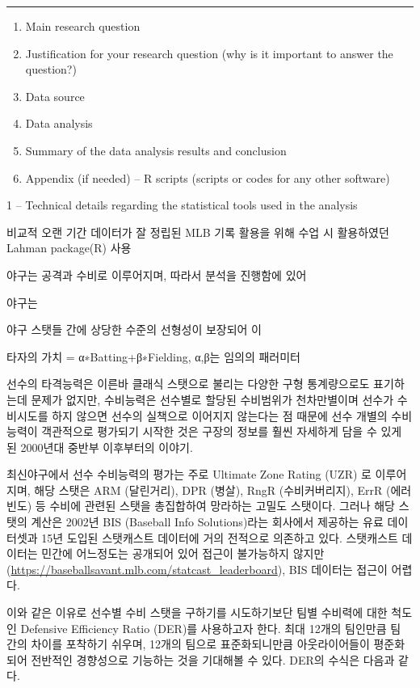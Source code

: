 \documentclass[
]{book}
\begin{document}
\begin{center}\rule{0.5\linewidth}{0.5pt}\end{center}

\begin{enumerate}
\def\labelenumi{\arabic{enumi}.}
\item
  Main research question
\item
  Justification for your research question (why is it important to answer the question?)
\item
  Data source
\item
  Data analysis
\item
  Summary of the data analysis results and conclusion
\item
  Appendix (if needed)
  -- R scripts (scripts or codes for any other software)
\end{enumerate}

1
-- Technical details regarding the statistical tools used in the analysis

비교적 오랜 기간 데이터가 잘 정립된 MLB 기록 활용을 위해
수업 시 활용하였던 Lahman package(R) 사용

야구는 공격과 수비로 이루어지며, 따라서 분석을 진행함에 있어

야구는

야구 스탯들 간에 상당한 수준의 선형성이 보장되어 이

타자의 가치 = α∗Batting+β∗Fielding, α,β는 임의의 패러미터

선수의 타격능력은 이른바 클래식 스탯으로 불리는 다양한 구형 통계량으로도 표기하는데 문제가 없지만, 수비능력은 선수별로 할당된 수비범위가 천차만별이며 선수가 수비시도를 하지 않으면 선수의 실책으로 이어지지 않는다는 점 때문에 선수 개별의 수비능력이 객관적으로 평가되기 시작한 것은 구장의 정보를 훨씬 자세하게 담을 수 있게 된 2000년대 중반부 이후부터의 이야기.

최신야구에서 선수 수비능력의 평가는 주로 Ultimate Zone Rating (UZR) 로 이루어지며, 해당 스탯은 ARM (달린거리), DPR (병살), RngR (수비커버리지), ErrR (에러빈도) 등 수비에 관련된 스탯을 총집합하여 망라하는 고밀도 스탯이다. 그러나 해당 스탯의 계산은 2002년 BIS (Baseball Info Solutions)라는 회사에서 제공하는 유료 데이터셋과 15년 도입된 스탯캐스트 데이터에 거의 전적으로 의존하고 있다. 스탯캐스트 데이터는 민간에 어느정도는 공개되어 있어 접근이 불가능하지 않지만 (\url{https://baseballsavant.mlb.com/statcast_leaderboard}), BIS 데이터는 접근이 어렵다.

이와 같은 이유로 선수별 수비 스탯을 구하기를 시도하기보단 팀별 수비력에 대한 척도인 Defensive Efficiency Ratio (DER)를 사용하고자 한다. 최대 12개의 팀인만큼 팀 간의 차이를 포착하기 쉬우며, 12개의 팀으로 표준화되니만큼 아웃라이어들이 평준화되어 전반적인 경향성으로 기능하는 것을 기대해볼 수 있다. DER의 수식은 다음과 같다.
\end{document}
